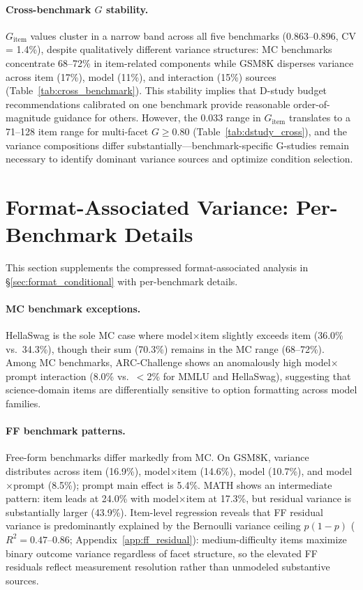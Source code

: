 \paragraph{Cross-benchmark $G$ stability.}
\label{app:cross_benchmark_transfer}
$G_\text{item}$ values cluster in a narrow band across all five benchmarks (0.863--0.896, CV = 1.4\%), despite qualitatively different variance structures: MC benchmarks concentrate 68--72\% in item-related components while GSM8K disperses variance across item (17\%), model (11\%), and interaction (15\%) sources (Table~\ref{tab:cross_benchmark}). This stability implies that D-study budget recommendations calibrated on one benchmark provide reasonable order-of-magnitude guidance for others. However, the 0.033 range in $G_\text{item}$ translates to a 71--128 item range for multi-facet $G \geq 0.80$ (Table~\ref{tab:dstudy_cross}), and the variance compositions differ substantially---benchmark-specific G-studies remain necessary to identify dominant variance sources and optimize condition selection.

\section{Format-Associated Variance: Per-Benchmark Details}
\label{app:format_details}

This section supplements the compressed format-associated analysis in \S\ref{sec:format_conditional} with per-benchmark details.

\paragraph{MC benchmark exceptions.} HellaSwag is the sole MC case where model$\times$item slightly exceeds item (36.0\% vs.\ 34.3\%), though their sum (70.3\%) remains in the MC range (68--72\%). Among MC benchmarks, ARC-Challenge shows an anomalously high model$\times$prompt interaction (8.0\% vs.\ $<$2\% for MMLU and HellaSwag), suggesting that science-domain items are differentially sensitive to option formatting across model families.

\paragraph{FF benchmark patterns.} Free-form benchmarks differ markedly from MC. On GSM8K, variance distributes across item (16.9\%), model$\times$item (14.6\%), model (10.7\%), and model$\times$prompt (8.5\%); prompt main effect is 5.4\%. MATH shows an intermediate pattern: item leads at 24.0\% with model$\times$item at 17.3\%, but residual variance is substantially larger (43.9\%). Item-level regression reveals that FF residual variance is predominantly explained by the Bernoulli variance ceiling $p(1{-}p)$ ($R^2 = 0.47$--$0.86$; Appendix~\ref{app:ff_residual}): medium-difficulty items maximize binary outcome variance regardless of facet structure, so the elevated FF residuals reflect measurement resolution rather than unmodeled substantive sources.

